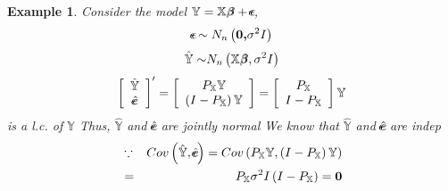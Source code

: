 \documentclass{article}
\newtheorem{example}[theorem]{Example}
\begin{document}
\begin{example}
Consider the model $\mathbb{Y=X}%
\beta\mkern-9.6mu \beta%
+%
\epsilon\mkern-10mu \epsilon%
$, 
\begin{equation*}
\epsilon\mkern-10mu \epsilon%
\sim N_{n}\left( \boldsymbol{0,}\sigma ^{2}I\right) 
\end{equation*}%
\begin{equation*}
\mathbb{\hat{Y}\sim }N_{n}\left( \mathbb{X}%
\beta\mkern-9.6mu \beta%
,\sigma ^{2}I\right) 
\end{equation*}%
\begin{equation*}
\left[ 
\begin{array}{c}
\mathbb{\hat{Y}} \\ 
\hat{e\mkern-10.5mu e}%
\end{array}%
\right] ^{\prime }=\left[ 
\begin{array}{c}
P_{\mathbb{X}}\mathbb{Y} \\ 
\left( I-P_{\mathbb{X}}\right) \mathbb{Y}%
\end{array}%
\right] =\left[ 
\begin{array}{c}
P_{\mathbb{X}} \\ 
I-P_{\mathbb{X}}%
\end{array}%
\right] \mathbb{Y}
\end{equation*}%
is a l.c. of $\mathbb{Y}$\newline
Thus, $\mathbb{\hat{Y}}$ and $%
\hat{e\mkern-10.5mu e}%
$ are jointly normal\newline
\newline
We know that $\mathbb{\hat{Y}}$ and $%
\hat{e\mkern-10.5mu e}%
$ are indep%
\begin{eqnarray*}
&\because &Cov\left( \mathbb{\hat{Y}},%
\hat{e\mkern-10.5mu e}%
\right) =Cov\left( P_{\mathbb{X}}\mathbb{Y},\left( I-P_{\mathbb{X}}\right) 
\mathbb{Y}\right)  \\
&=&P_{\mathbb{X}}\sigma ^{2}I\left( I-P_{\mathbb{X}}\right) =\boldsymbol{0}
\end{eqnarray*}
\end{example}
\end{document}
